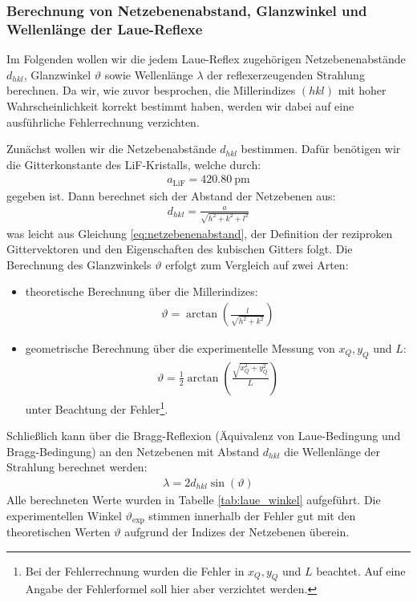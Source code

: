 \documentclass[11pt, a4paper]{article}
\begin{document}
\subsubsection{Berechnung von Netzebenenabstand, Glanzwinkel und Wellenlänge der Laue-Reflexe}
Im Folgenden wollen wir die jedem Laue-Reflex zugehörigen Netzebenenabstände $d_{hkl}$, Glanzwinkel $\vartheta$ sowie Wellenlänge $\lambda$ der reflexerzeugenden Strahlung berechnen.
Da wir, wie zuvor besprochen, die Millerindizes $(hkl)$ mit hoher Wahrscheinlichkeit korrekt bestimmt haben, werden wir dabei auf eine ausführliche Fehlerrechnung verzichten.

Zunächst wollen wir die Netzebenabstände $d_{hkl}$ bestimmen.
Dafür benötigen wir die Gitterkonstante des LiF-Kristalls, welche durch:
\begin{align*}
  a_\mathrm{LiF} = \SI{420.80}{\pico\metre}
\end{align*}
gegeben ist\cite{crc}.
Dann berechnet sich der Abstand der Netzebenen aus:
\begin{align}
  d_{hkl} = \frac{a}{\sqrt{h^2+k^2+l^2}}
\end{align}
was leicht aus Gleichung \ref{eq:netzebenenabstand}, der Definition der reziproken Gittervektoren und den Eigenschaften des kubischen Gitters folgt.
Die Berechnung des Glanzwinkels $\vartheta$ erfolgt zum Vergleich auf zwei Arten:
\begin{itemize}
  \item theoretische Berechnung über die Millerindizes:
  \begin{align}
    \vartheta = \arctan{\left( \frac{l}{\sqrt{h^2+k^2}} \right)}
    \label{eq:millerglanzwinkel}
  \end{align}
  
  \item geometrische Berechnung über die experimentelle Messung von $x_Q, y_Q$ und $L$:
  \begin{align}
    \vartheta = \frac{1}{2} \arctan{\left( \frac{\sqrt{x_Q^2 + y_Q^2}}{L} \right)}
  \end{align}
  unter Beachtung der Fehler\footnote{Bei der Fehlerrechnung wurden die Fehler in $x_Q, y_Q$ und $L$ beachtet. Auf eine Angabe der Fehlerformel soll hier aber verzichtet werden.}.
\end{itemize}
Schließlich kann über die Bragg-Reflexion (Äquivalenz von Laue-Bedingung und Bragg-Bedingung) an den Netzebenen mit Abstand $d_{hkl}$ die Wellenlänge der Strahlung berechnet werden:
\begin{align}
  \lambda = 2 d_{hkl} \sin(\vartheta)
\end{align}
Alle berechneten Werte wurden in Tabelle \ref{tab:laue_winkel} aufgeführt.
Die experimentellen Winkel $\vartheta_\mathrm{exp}$ stimmen innerhalb der Fehler gut mit den theoretischen Werten $\vartheta$ aufgrund der Indizes der Netzebenen überein.
\end{document}
